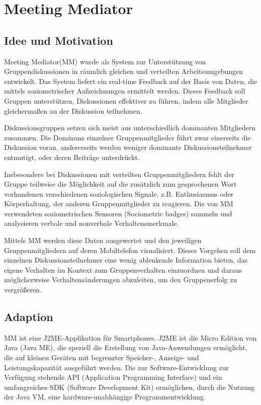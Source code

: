 \section{Meeting Mediator}

\subsection{Idee und Motivation}
Meeting Mediator(MM) \cite{KimChaHolPent2008} wurde als System zur
Un\-ter\-stütz\-ung von Gruppendiskussionen in räumlich gleichen und verteilten
Arbeitsumgebungen entwickelt. Das System liefert ein real-time Feedback auf der
Basis von Daten, die mittels soziometrischer Aufzeichnungen ermittelt werden.
Dieses Feedback soll Gruppen unterstützen, Diskussionen effektiver zu führen,
indem alle Mitglieder gleichermaßen an der Diskussion teilnehmen.

Diskussionsgruppen setzen sich meist aus unterschiedlich dominanten Mitgliedern
zusammen. Die Dominanz einzelner Gruppenmitglieder führt zwar einerseits die
Diskussion voran, andererseits werden weniger dominante Diskussionsteilnehmer 
entmutigt, oder deren Beiträge un\-ter\-drückt.

Insbesondere bei Diskussionen mit verteilten Gruppenmitgliedern fehlt der
Gruppe teilweise die Möglichkeit auf die zusätzlich zum gesprochenen Wort
vorhandenen verschiedenen soziologischen Signale, z.B. Enthusiasmus oder
Kör\-per\-hal\-tung, der anderen Gruppenmitglieder zu reagieren.
Die von MM verwendeten soziometrischen Sensoren (Sociometric badges)
\cite{MITbadge} sammeln und analysieren verbale und nonverbale
Verhaltensmerkmale.

Mittels MM werden diese Daten ausgewertet und den jeweiligen Gruppenmitgliedern
auf deren Mobiltelefon visualisiert. Dieses Vorgehen soll dem einzelnen
Diskussionsteilnehmer eine wenig ablenkende Information bieten, das eigene
Verhalten im Kontext zum Gruppenverhalten einzuordnen und daraus möglicherweise
Ver\-hal\-tens\-än\-de\-run\-gen abzuleiten, um den Gruppenerfolg zu
vergrößeren.

\subsection{Adaption}

MM ist eine J2ME-Applikation für Smartphones. J2ME \cite{J2ME} ist die Micro
Edition von Java (Java ME), die speziell die Erstellung von Java-Anwendungen
ermöglicht, die auf kleinen Geräten mit begrenzter Speicher-, Anzeige- und
Leistungskapazität ausgeführt werden. Die zur Software-Ent\-wick\-lung zur
Verfügung stehende API (Application Programming Interface) und ein umfangreiches
SDK (Software Development Kit) ermöglichen, durch die Nutzung der Java VM, eine
hardware-un\-ab\-hän\-gi\-ge Programmentwicklung.

